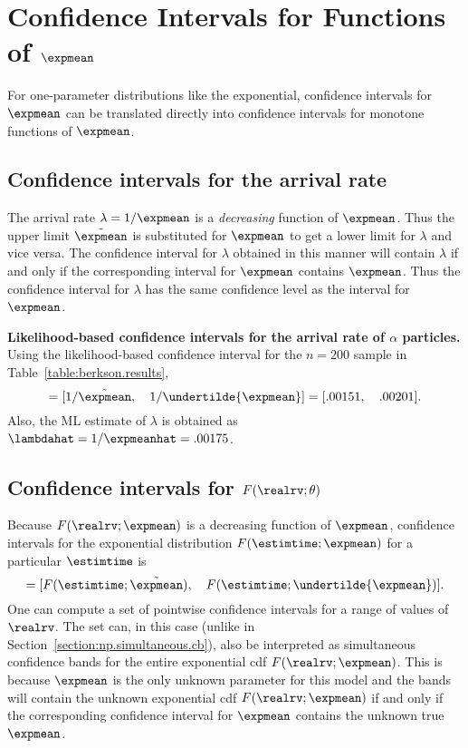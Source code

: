 \section{Confidence Intervals for Functions of $\expmean$}
\label{section:one.par.ci.functions}

For one-parameter distributions like the exponential, confidence
intervals for $\expmean$ can be translated directly into confidence
intervals for monotone functions of $\expmean$.

\subsection{Confidence intervals for the arrival rate}
\label{section:ci.on.lambda}
The arrival rate $\lambda=1/\expmean$ is a {\em decreasing} function
of $\expmean$. Thus the upper limit $\tilde{\expmean}$ is
substituted for $\expmean$ to get a lower limit for $\lambda$ and
vice versa.  The confidence interval for $\lambda$ obtained in this
manner will contain $\lambda$ if and only if the corresponding
interval for $\expmean$ contains $\expmean$. Thus the confidence
interval for $\lambda$ has the same confidence level as the interval
for $\expmean$.
\begin{example} 
{\bf Likelihood-based confidence intervals for the arrival rate
of $\alpha$ particles.} Using the 
likelihood-based confidence interval for the $n=200$ sample in
Table~\ref{table:berkson.results},
\begin{displaymath}
 [ \undertilde{\lambda}, \quad  \tilde{\lambda} ] = 
 [1/ \tilde{\expmean}, \quad  1/ \undertilde{\expmean} ] =  [.00151,
\quad  .00201].
\end{displaymath}
Also, the ML estimate of $\lambda$ is obtained as
$\lambdahat  =  1/\expmeanhat = .00175 $.
\end{example}

\subsection{Confidence intervals for $F(\realrv;\theta)$}
\label{section:exp.ci.f}
Because $F(\realrv;\expmean)$ is a decreasing
function of $\expmean$, confidence intervals for the exponential
distribution $F(\estimtime;\expmean)$ for a particular
$\estimtime$ is
\begin{displaymath}
[\Flower(\estimtime), \quad \Fupper(\estimtime)] = 
[ F(\estimtime;\tilde{\expmean}), \quad 
F(\estimtime;\undertilde{\expmean})].
\end{displaymath}
One can compute a set of pointwise confidence intervals
for a range of values of $\realrv$. The set can, in this case
(unlike in Section~\ref{section:np.simultaneous.cb}), also be
interpreted as simultaneous confidence bands for the entire
exponential cdf $F(\realrv;\expmean)$.  This is because $\expmean$
is the only unknown parameter for this model and the bands will contain
the unknown exponential cdf $F(\realrv;\expmean)$ if and only if the
corresponding confidence interval for $\expmean$ contains the unknown
true $\expmean$.


